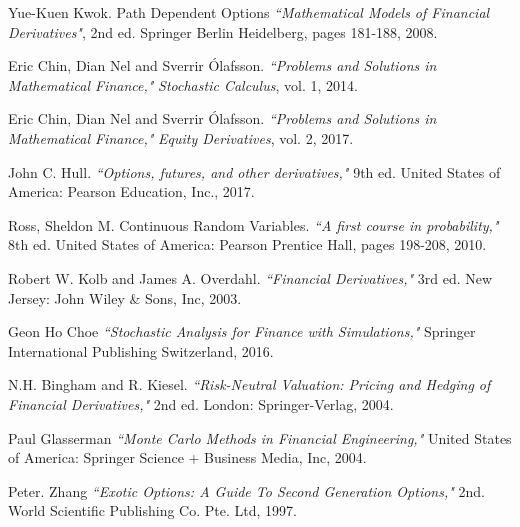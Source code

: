 \documentclass[12pt,a4paper,left=2cm,right=2cm,oneside,titlepage]{report}
\numberwithin{equation}{section}
\begin{document}
	
	
	\newpage
	\setcounter{page}{1}	
	
	
	
	
	
	
	\begin{thebibliography}{9}
		Yue-Kuen Kwok. Path Dependent Options  
		\textit{``Mathematical Models
			of Financial Derivatives"}, 2nd ed.
		Springer Berlin Heidelberg, pages 181-188, 2008.
		
	Eric Chin, Dian Nel and Sverrir Ólafsson.  
		\textit{``Problems and Solutions
			in Mathematical Finance,"} \textit{Stochastic Calculus},
		 vol. 1, 2014. 
		
		Eric Chin, Dian Nel and Sverrir Ólafsson.  
		\textit{``Problems and Solutions
			in Mathematical Finance,"} \textit{Equity Derivatives},
		vol. 2, 2017.
		
		John C. Hull.  
		\textit{``Options, futures, and other derivatives,"} 
		9th ed. United States of
		America: Pearson Education, Inc., 2017. 

		Ross, Sheldon M. Continuous Random Variables.  
		\textit{``A first course in probability,"} 
		8th ed. United States of
		America: Pearson Prentice Hall, pages 198-208, 2010. 

		Robert W. Kolb and James A. Overdahl. 
		\textit{``Financial Derivatives,"} 3rd ed. New Jersey: John Wiley \& Sons, Inc, 2003. 
		
		Geon Ho Choe 
		\textit{``Stochastic Analysis for Finance with Simulations,"} Springer International Publishing Switzerland, 2016. 
		
		N.H. Bingham and R. Kiesel.
		\textit{``Risk-Neutral Valuation: Pricing and Hedging of Financial Derivatives,"} 2nd ed. London: Springer-Verlag, 2004. 
		
		 Paul Glasserman
		\textit{``Monte Carlo Methods in Financial Engineering,"} United States of
		America: Springer Science + Business Media, Inc, 2004.
		
		Peter. Zhang
		\textit{``Exotic Options: A Guide To Second Generation Options,"} 2nd. World Scientific Publishing Co. Pte. Ltd, 1997.
		
	
	\end{thebibliography}
	\begin{appendices}
		
	\end{appendices}	
\end{document}
